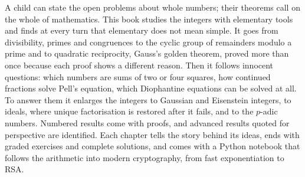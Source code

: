 A child can state the open problems about whole numbers; their theorems call on the whole of mathematics. This book
studies the integers with elementary tools and finds at every turn that elementary does not mean simple. It goes from
divisibility, primes and congruences to the cyclic group of remainders modulo a prime and to quadratic reciprocity,
Gauss's golden theorem, proved more than once because each proof shows a different reason. Then it follows innocent
questions: which numbers are sums of two or four squares, how continued fractions solve Pell's equation, which
Diophantine equations can be solved at all. To answer them it enlarges the integers to Gaussian and Eisenstein
integers, to ideals, where unique factorisation is restored after it fails, and to the $p$-adic numbers. Numbered results come
with proofs, and advanced results quoted for perspective are identified. Each chapter tells the story behind its ideas, ends with graded exercises and complete solutions, and
comes with a Python notebook that follows the arithmetic into modern cryptography, from fast exponentiation to RSA.

